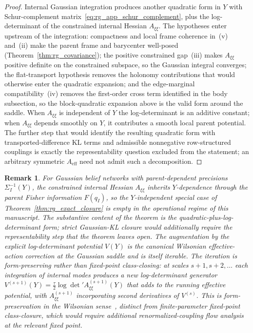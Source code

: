 \documentclass[11pt]{article}
\newtheorem{remark}{Remark}
\begin{document}
\begin{proof}
Internal Gaussian integration produces another quadratic form in $Y$ with Schur-complement matrix~\eqref{eq:rg_app_schur_complement}, plus the log-determinant of the constrained internal Hessian $A_{\xi\xi}$. The hypotheses enter upstream of the integration: compactness and local frame coherence in~(v) and~(ii) make the parent frame and barycenter well-posed (Theorem~\ref{thm:rg_covariance}); the positive constrained gap~(iii) makes $A_{\xi\xi}$ positive definite on the constrained subspace, so the Gaussian integral converges; the flat-transport hypothesis removes the holonomy contributions that would otherwise enter the quadratic expansion; and the edge-marginal compatibility~(iv) removes the first-order cross term identified in the body subsection, so the block-quadratic expansion above is the valid form around the saddle. When $A_{\xi\xi}$ is independent of $Y$ the log-determinant is an additive constant; when $A_{\xi\xi}$ depends smoothly on $Y$, it contributes a smooth local parent potential. The further step that would identify the resulting quadratic form with transported-difference KL terms and admissible nonnegative row-structured couplings is exactly the representability question excluded from the statement; an arbitrary symmetric $A_{\mathrm{eff}}$ need not admit such a decomposition.
\end{proof}

\begin{remark}
For Gaussian belief networks with parent-dependent precisions $\Sigma_I^{-1}(Y)$, the constrained internal Hessian $A_{\xi\xi}$ inherits $Y$-dependence through the parent Fisher information $F(q_I)$, so the $Y$-independent special case of Theorem~\ref{thm:rg_exact_closure} is empty in the operational regime of this manuscript. The substantive content of the theorem is the quadratic-plus-log-determinant form; strict Gaussian-KL closure would additionally require the representability step that the theorem leaves open. The augmentation by the explicit log-determinant potential $V(Y)$ is the canonical Wilsonian effective-action correction at the Gaussian saddle and is itself iterable. The iteration is form-preserving rather than fixed-point class-closing: at scales $s+1, s+2, \ldots$ each integration of internal modes produces a new log-determinant generator $V^{(s+1)}(Y) = \tfrac{\tau}{2}\log\det' A_{\xi\xi}^{(s+1)}(Y)$ that adds to the running effective potential, with $A_{\xi\xi}^{(s+1)}$ incorporating second derivatives of $V^{(s)}$. This is form-preservation in the Wilsonian sense~\cite{Wilson1974, Cardy1996}, distinct from finite-parameter fixed-point class-closure, which would require additional renormalized-coupling flow analysis at the relevant fixed point.
\end{remark}
\end{document}
